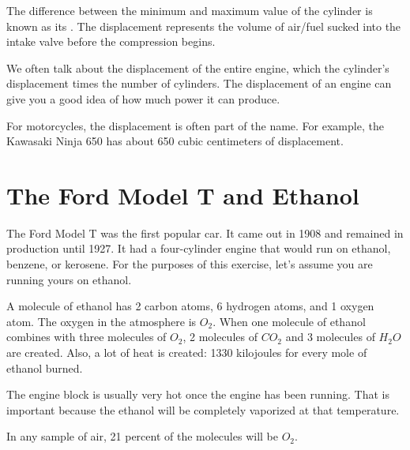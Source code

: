 The difference between the minimum and maximum value of the cylinder is known as its .   The displacement represents the volume of air/fuel sucked into the intake valve 
before the compression begins.

We often talk about the displacement of the entire engine, which the
 cylinder's displacement times the number of cylinders.  The displacement of an engine can give you a
 good idea of how much power it can produce.
 
For motorcycles,  the displacement is often part of the name.   For example,  the Kawasaki Ninja 650 has about 650 cubic centimeters of displacement.  

\section{The Ford Model T and Ethanol}

The Ford Model T was the first popular car.   It came out in 1908 and remained in production until 1927.  It had a four-cylinder engine that would run on ethanol, benzene, or kerosene.  For the purposes of this exercise, let's assume you are running yours on ethanol.

A molecule of ethanol has 2 carbon atoms, 6 hydrogen atoms, and 1 oxygen atom.  The oxygen in the atmosphere is $O_2$.   When one molecule of ethanol combines with three molecules of $O_2$,  2 molecules of $CO_2$ and 3 molecules of $H_2O$ are created.  Also, a lot of heat is created: 1330 kilojoules for every mole of ethanol burned.

The engine block is usually very hot once the engine has been running.  That is important because the ethanol will be completely vaporized at that temperature.

In any sample of air,  21 percent of the molecules will be $O_2$.

